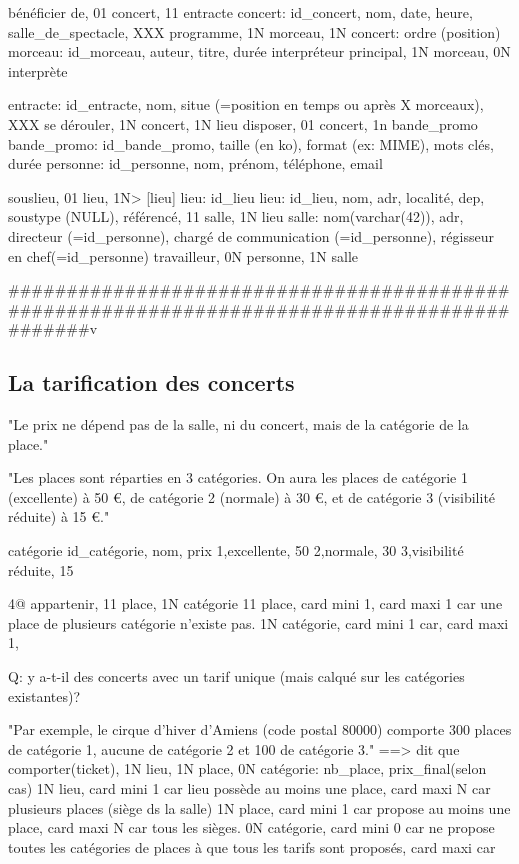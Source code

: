 \documentclass[12pt,a4paper]{article}
\begin{document}
{bénéficier de, 01 concert, 11 entracte
concert: id_concert, nom, date, heure, salle_de_spectacle, XXX
programme, 1N morceau, 1N concert: ordre (position)
morceau: id_morceau, auteur, titre, durée
interpréteur principal, 1N morceau, 0N interprète

entracte: id_entracte, nom, situe (=position en temps ou après X morceaux), XXX
se dérouler, 1N concert, 1N lieu
disposer, 01 concert, 1n bande_promo
bande_promo: id_bande_promo, taille (en ko), format (ex: MIME), mots clés, durée
personne: id_personne, nom, prénom, téléphone, email

souslieu, 01 lieu,   1N> [lieu] lieu: id_lieu
lieu: id_lieu, nom, adr, localité, dep, soustype (NULL),
référencé, 11 salle, 1N lieu
salle: nom(varchar(42)), adr, directeur (=id_personne), chargé de communication (=id_personne), régisseur en chef(=id_personne)
travailleur, 0N personne, 1N salle

#############################################################################################v





\subsection{La tarification des concerts}


"Le prix ne dépend pas de la salle, ni du concert, mais de la catégorie de la place."

"Les places sont réparties en 3 catégories. On aura les places de catégorie 1 (excellente) à 50 €, de catégorie 2 (normale) à 30 €, et de catégorie 3 (visibilité réduite) à 15 €."

catégorie
id_catégorie, nom, prix
1,excellente, 50
2,normale, 30
3,visibilité réduite, 15



4@ appartenir, 11 place, 1N catégorie
11 place, card mini 1, card maxi 1 car une place de plusieurs catégorie n'existe pas.
1N catégorie, card mini 1 car, card maxi 1, 

Q: y a-t-il des concerts avec un tarif unique (mais calqué sur les catégories existantes)?




"Par exemple, le cirque d'hiver d'Amiens (code postal 80000) comporte 300 places de catégorie 1, aucune de catégorie 2 et 100 de catégorie 3."
==> dit que comporter(ticket), 1N lieu, 1N place, 0N catégorie: nb_place, prix_final(selon cas)
1N lieu, card mini 1 car lieu possède au moins une place, card maxi N car plusieurs places (siège ds la salle)
1N place, card mini 1 car propose au moins une place, card maxi N car tous les sièges.
0N catégorie, card mini 0 car ne propose toutes les catégories de places à  que tous les tarifs sont proposés, card maxi car

}
\end{document}
